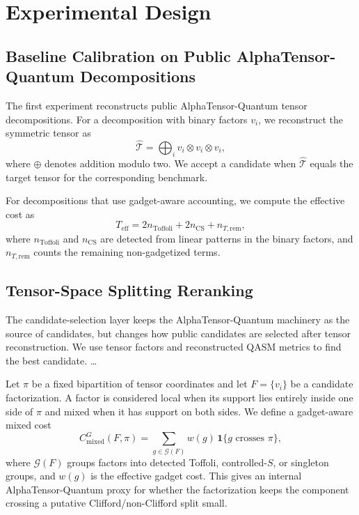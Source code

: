 \documentclass[conference]{IEEEtran}
\newcommand{\atq}{AlphaTensor-Quantum}
\newcommand{\Teff}{T_{\mathrm{eff}}}
\newcommand{\Cmixed}{C_{\mathrm{mixed}}}
\begin{document}
\section{Experimental Design}

\subsection{Baseline Calibration on Public \atq{} Decompositions}

The first experiment reconstructs public \atq{} tensor decompositions. For a decomposition with binary factors $v_i$, we reconstruct the symmetric tensor as
\begin{equation}
\widehat{\mathcal{T}}
=
\bigoplus_i v_i \otimes v_i \otimes v_i,
\end{equation}
where $\oplus$ denotes addition modulo two. We accept a candidate when $\widehat{\mathcal{T}}$ equals the target tensor for the corresponding benchmark.

For decompositions that use gadget-aware accounting, we compute the effective cost as
\begin{equation}
\Teff
=
2n_{\mathrm{Toffoli}}
+
2n_{\mathrm{CS}}
+
n_{T,\mathrm{rem}},
\end{equation}
where $n_{\mathrm{Toffoli}}$ and $n_{\mathrm{CS}}$ are detected from linear patterns in the binary factors, and $n_{T,\mathrm{rem}}$ counts the remaining non-gadgetized terms.

\subsection{Tensor-Space Splitting Reranking}

The candidate-selection layer keeps the \atq{} machinery as the source of candidates, but changes how public candidates are selected after tensor reconstruction. We use tensor factors and reconstructed QASM metrics to find the best candidate. \dots

Let $\pi$ be a fixed bipartition of tensor coordinates and let $F=\{v_i\}$ be a candidate factorization. A factor is considered local when its support lies entirely inside one side of $\pi$ and mixed when it has support on both sides. We define a gadget-aware mixed cost
\begin{equation}
\Cmixed^G(F,\pi)
=
\sum_{g \in \mathcal{G}(F)}
w(g)\,\mathbf{1}\{g \text{ crosses } \pi\},
\end{equation}
where $\mathcal{G}(F)$ groups factors into detected Toffoli, controlled-$S$, or singleton groups, and $w(g)$ is the effective gadget cost. This gives an internal \atq{} proxy for whether the factorization keeps the component crossing a putative Clifford/non-Clifford split small.
\end{document}
